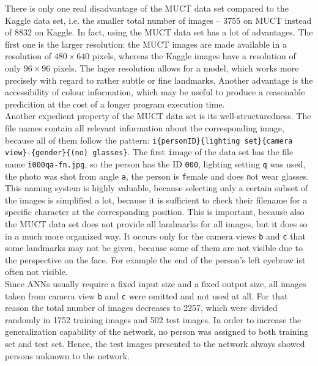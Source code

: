 \documentclass[11pt, a4paper]{article}
\begin{document}
There is only one real disadvantage of the \ac{MUCT} data set compared to the Kaggle data set, i.e. the smaller total number of images -- 3755 on \ac{MUCT} instead of 8832 on Kaggle. In fact, using the \ac{MUCT} data set has a lot of advantages. The first one is the larger resolution: the \ac{MUCT} images are made available in a resolution of $480 \times 640$ pixels, whereas the Kaggle images have a resolution of only $96 \times 96$ pixels. The lager resolution allows for a model, which works more precisely with regard to rather subtle or fine landmarks. Another advantage is the accessibility of colour information, which may be useful to produce a reasonable predicition at the cost of a longer program execution time.\\
Another expedient property of the \ac{MUCT} data set is its well-structuredness. The file names contain all relevant information about the corresponding image, because all of them follow the pattern: \texttt{i\{personID\}\{lighting set\}\{camera view\}-\{gender\}\{(no) glasses\}}. The first \texttt{i}mage of the data set has the file name \texttt{i000qa-fn.jpg}, so the person has the ID \texttt{000}, lighting setting \texttt{q} was used, the photo was shot from angle \texttt{a}, the person is \texttt{f}emale and does \texttt{n}ot wear glasses.\\
This naming system is highly valuable, because selecting only a certain subset of the images is simplified a lot, because it is sufficient to check their filename for a specific character at the corresponding position. This is important, because also the \ac{MUCT} data set does not provide all landmarks for all images, but it does so in a much more organized way. It occurs only for the camera views \texttt{b} and \texttt{c} that some landmarks may not be given, because some of them are not visible due to the perspective on the face. For example the end of the person's left eyebrow ist often not visible.\\
Since \acp{ANN} usually require a fixed input size and a fixed output size, all images taken from camera view \texttt{b} and \texttt{c} were omitted and not used at all. For that reason the total number of images decreases to 2257, which were divided randomly in 1752 training images and 502 test images. In order to increase the generalization capability of the network, no person was assigned to both training set and test set. Hence, the test images presented to the network always showed persons unknown to the network.

\newpage
\end{document}
